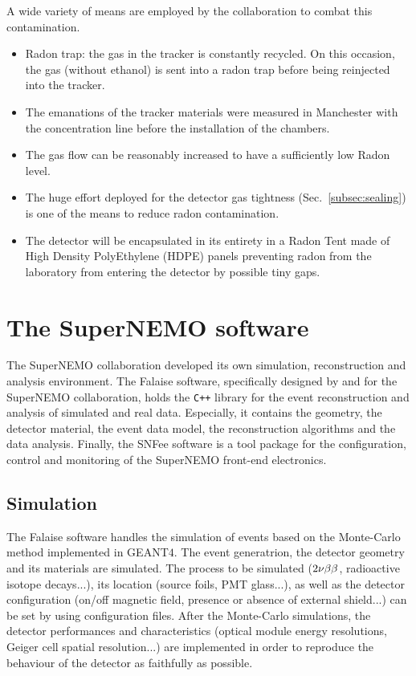 A wide variety of means are employed by the collaboration to combat this contamination.
\begin{itemize}
\item Radon trap: the gas in the tracker is constantly recycled.
  On this occasion, the gas (without ethanol) is sent into a radon trap before being reinjected into the tracker.
\item The emanations of the tracker materials were measured in Manchester with the concentration line before the installation of the chambers.
\item The gas flow can be reasonably increased to have a sufficiently low Radon level.
\item The huge effort deployed for the detector gas tightness (Sec.~\ref{subsec:sealing}) is one of the means to reduce radon contamination.
\item The detector will be encapsulated in its entirety in a Radon Tent made of High Density PolyEthylene (HDPE) panels preventing radon from the laboratory from entering the detector by possible tiny gaps.
\end{itemize}


\section{The SuperNEMO software}
\label{sec:SNsoftware}

The SuperNEMO collaboration developed its own simulation, reconstruction and analysis environment.
The Falaise software, specifically designed by and for the SuperNEMO collaboration, holds the \verb!C++! library for the event reconstruction and analysis of simulated and real data.
Especially, it contains the geometry, the detector material, the event data model, the reconstruction algorithms and the data analysis.
Finally, the SNFee software is a tool package for the configuration, control and monitoring of the SuperNEMO front-end electronics.


\subsection{Simulation}

The Falaise software handles the simulation of events based on the Monte-Carlo method implemented in GEANT$4$.
The event generatrion, the detector geometry and its materials are simulated.
The process to be simulated ($2\nu\beta\beta$, radioactive isotope decays...), its location (source foils, PMT glass...), as well as the detector configuration (on/off magnetic field, presence or absence of external shield...) can be set by using configuration files.
After the Monte-Carlo simulations, the detector performances and characteristics (optical module energy resolutions, Geiger cell spatial resolution...) are implemented in order to reproduce the behaviour of the detector as faithfully as possible.


